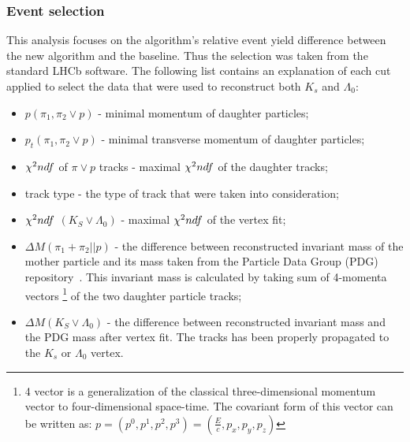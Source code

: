 \subsubsection{Event selection}

This analysis focuses on the algorithm's relative event yield difference between the new algorithm and the baseline. Thus the selection was taken from the standard LHCb software. The following list contains an explanation of each cut applied to select the data that were used to reconstruct both $K_s$ and $\Lambda_{0}$:

\begin{itemize}
    \item \textbf{$p(\pi_1, \pi_2 \lor p)$} - minimal momentum of daughter particles;
    \item \textbf{$p_t(\pi_1, \pi_2 \lor p)$} - minimal transverse momentum of daughter particles;
    \item $\chi^2\/ndf$ of $\pi \lor p$ tracks - maximal  $\chi^2\/ndf$ of the daughter tracks;
    \item track type - the type of track that were taken into consideration;
    \item $\chi^2\/ndf$ $(K_S \lor \Lambda_0)$ - maximal $\chi^2\/ndf$ of the vertex fit;
    \item $\Delta M(\pi_1 + \pi_2 || p)$ - the difference between reconstructed invariant mass of the mother particle and its mass taken from the Particle Data Group (PDG) repository~\cite{PDG}. This invariant mass is calculated by taking sum of 4-momenta vectors \footnote{4 vector is a generalization of the classical three-dimensional momentum vector to four-dimensional space-time. The covariant form of this vector can be written as: $p= (p^{0}, p^{1}, p^{2}, p^{3}) = (\frac{E}{c},p_x,p_y,p_z) $ }  of the two daughter particle tracks;   
    \item $\Delta M(K_S \lor \Lambda_0)$ -  the difference between reconstructed invariant mass and the PDG mass after vertex fit. The tracks has been properly propagated to the $K_s$ or $\Lambda_0$  vertex. 
\end{itemize}

